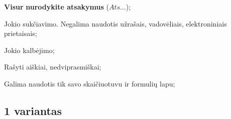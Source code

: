 \documentclass[a4paper]{article}
\begin{document}
\begin{small}
      \begin{enumerate*}[label={(\arabic*)}]
            \item \textbf{Visur} \textbf{nurodykite atsakymus} ($Ats\ldots$);
            \item Jokio sukčiavimo. Negalima naudotis užrašais, vadovėliais, elektroniniais
                  prietaisais;
            \item Jokio kalbėjimo;
            \item Rašyti aiškiai, nedviprasmiškai;
            \item Galima naudotis tik savo skaičiuotuvu ir formulių lapu;
      \end{enumerate*}
\end{small}


\subsection*{1 variantas}
\end{document}
